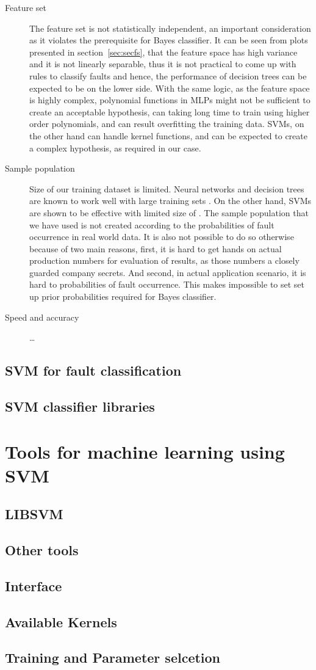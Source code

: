 \begin{description}
  \item[Feature set] The feature set is not statistically independent, an important consideration as it violates the prerequisite for Bayes classifier. It can be seen from plots presented in section~\ref{sec:secfs}, that the feature space has high variance and it is not linearly separable, thus it is not practical to come up with rules to classify faults and hence, the performance of decision trees can be expected to be on the lower side. With the same logic, as the feature space is highly complex, polynomial functions in MLPs might not be sufficient to create an acceptable hypothesis, can taking long time to train using higher order polynomials, and can result overfitting the training data. SVMs, on the other hand can handle kernel functions, and can be expected to create a complex hypothesis, as required in our case.

  \item[Sample population] Size of our training dataset is limited. Neural networks and decision trees are known to work well with large training sets \cite{DeFries2000,Tanwani2009}. On the other hand, SVMs are shown to be effective with limited size of \cite{Koggalage2004}. The sample population that we have used is not created according to the probabilities of fault occurrence in real world data. It is also not possible to do so otherwise because of two main reasons, first, it is hard to get hands on actual production numbers for evaluation of results, as those numbers a closely guarded company secrets. And second, in actual application scenario, it is hard to probabilities of fault occurrence. This makes impossible to set set up prior probabilities required for Bayes classifier.
  \item[Speed and accuracy] \cite{Matlab2014} \ldots
\end{description}

\subsection{SVM for fault classification}
\subsection{SVM classifier libraries}
\section{Tools for machine learning using SVM}
\label{sec:mltools}
\subsection{LIBSVM}
\subsection{Other tools}
\subsection{Interface}
\subsection{Available Kernels}
\subsection{Training and Parameter selcetion}
